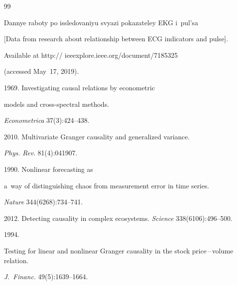 {\small\frenchspacing

{%


\begin{thebibliography}{99}


Dannye raboty po issledovaniyu svyazi pokazateley EKG i~pul'sa

[Data from research about relationship between ECG indicators and pulse]. 

Available at {\sf http:// ieeexplore.ieee.org/document/7185325}

(accessed May~17, 2019). 




 1969. Investigating causal relations by econometric 

models and cross-spectral methods. 

\textit{Econometrica} 37(3):424--438.



2010. Multivariate Granger causality and generalized variance. 

\textit{Phys. Rev.} 81(4):041907.




 1990. Nonlinear forecasting as 

a~way of distinguishing chaos from measurement error in time series. 

\textit{Nature} 344(6268):734--741.



2012. Detecting causality in complex ecosystems. \textit{Science} 338(6106):496--500.




 1994. 

Testing for linear and nonlinear Granger causality in the stock price\,--\,volume relation. 

\textit{J.~Financ.} 49(5):1639--1664.



\end{thebibliography}}}
